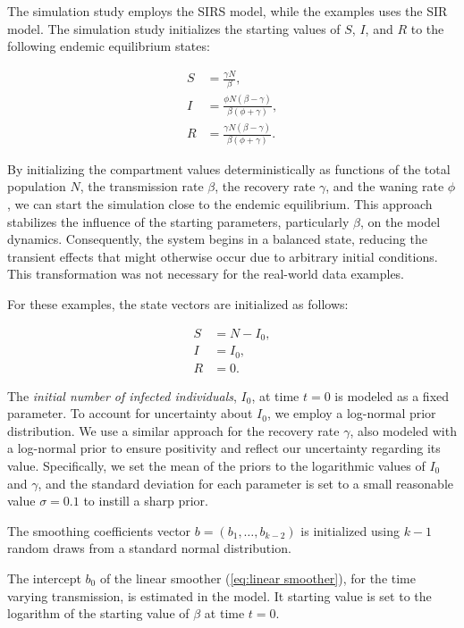 \documentclass[
11pt, %
oneside, %
english, %
singlespacing, %
]{macthesis} %
\begin{document}
The simulation study employs the SIRS model, while the examples uses the SIR model. The simulation study initializes the starting values of \(S\), \(I\), and \(R\) to the following endemic equilibrium states:

\[
\begin{aligned}
S &= \frac{\gamma N}{\beta}, \\
I &= \frac{\phi N (\beta - \gamma)}{\beta(\phi + \gamma)}, \\
R &= \frac{\gamma N (\beta - \gamma)}{\beta (\phi + \gamma)}.
\end{aligned}
\]

By initializing the compartment values deterministically as functions of the total population \(N\), the transmission rate \(\beta\), the recovery rate \(\gamma\), and the waning rate \(\phi\), we can start the simulation close to the endemic equilibrium. This approach stabilizes the influence of the starting parameters, particularly \(\beta\), on the model dynamics. Consequently, the system begins in a balanced state, reducing the transient effects that might otherwise occur due to arbitrary initial conditions. This transformation was not necessary for the real-world data examples.

For these examples, the state vectors are initialized as follows:

\[
\begin{aligned}
S &= N - I_0, \\
I &= I_0, \\
R &= 0.
\end{aligned}
\]

The \emph{initial number of infected individuals}, \(I_0\), at time \(t=0\) is modeled as a fixed parameter. To account for uncertainty about \(I_0\), we employ a log-normal prior distribution. We use a similar approach for the recovery rate \(\gamma\), also modeled with a log-normal prior to ensure positivity and reflect our uncertainty regarding its value. Specifically, we set the mean of the priors to the logarithmic values of \(I_0\) and \(\gamma\), and the standard deviation for each parameter is set to a small reasonable value \(\sigma = 0.1\) to instill a sharp prior.

The smoothing coefficients vector \(b = (b_1, \ldots, b_{k-2})\) is initialized using \(k-1\) random draws from a standard normal distribution.

The intercept \(b_0\) of the linear smoother (\ref{eq:linear smoother}), for the time varying transmission, is estimated in the model. It starting value is set to the logarithm of the starting value of \(\beta\) at time \(t= 0\).
\end{document}
